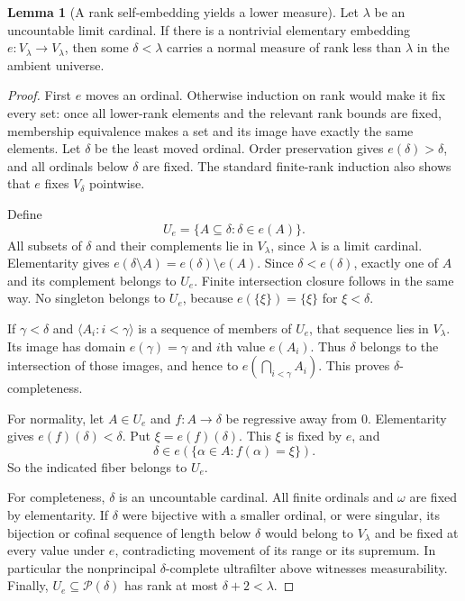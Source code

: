 \documentclass[11pt,letterpaper]{article}
\theoremstyle{definition}
\newtheorem{lemma}[definition]{Lemma}
\numberwithin{equation}{section}
\begin{document}
\begin{lemma}[A rank self-embedding yields a lower measure]\label{lem:I3measure}
Let $\lambda$ be an uncountable limit cardinal. If there is a nontrivial elementary embedding $e:V_\lambda\to V_\lambda$, then some $\delta<\lambda$ carries a normal measure of rank less than $\lambda$ in the ambient universe.
\end{lemma}
\begin{proof}
First $e$ moves an ordinal. Otherwise induction on rank would make it fix every set: once all lower-rank elements and the relevant rank bounds are fixed, membership equivalence makes a set and its image have exactly the same elements. Let $\delta$ be the least moved ordinal. Order preservation gives $e(\delta)>\delta$, and all ordinals below $\delta$ are fixed. The standard finite-rank induction also shows that $e$ fixes $V_\delta$ pointwise.

Define
\[
 U_e=\{A\subseteq\delta:\delta\in e(A)\}.
\]
All subsets of $\delta$ and their complements lie in $V_\lambda$, since $\lambda$ is a limit cardinal. Elementarity gives $e(\delta\setminus A)=e(\delta)\setminus e(A)$. Since $\delta<e(\delta)$, exactly one of $A$ and its complement belongs to $U_e$. Finite intersection closure follows in the same way. No singleton belongs to $U_e$, because $e(\{\xi\})=\{\xi\}$ for $\xi<\delta$.

If $\gamma<\delta$ and $\langle A_i:i<\gamma\rangle$ is a sequence of members of $U_e$, that sequence lies in $V_\lambda$. Its image has domain $e(\gamma)=\gamma$ and $i$th value $e(A_i)$. Thus $\delta$ belongs to the intersection of those images, and hence to $e(\bigcap_{i<\gamma}A_i)$. This proves $\delta$-completeness.

For normality, let $A\in U_e$ and $f:A\to\delta$ be regressive away from $0$. Elementarity gives $e(f)(\delta)<\delta$. Put $\xi=e(f)(\delta)$. This $\xi$ is fixed by $e$, and
\[
 \delta\in e(\{\alpha\in A:f(\alpha)=\xi\}).
\]
So the indicated fiber belongs to $U_e$.

For completeness, $\delta$ is an uncountable cardinal. All finite ordinals and $\omega$ are fixed by elementarity. If $\delta$ were bijective with a smaller ordinal, or were singular, its bijection or cofinal sequence of length below $\delta$ would belong to $V_\lambda$ and be fixed at every value under $e$, contradicting movement of its range or its supremum. In particular the nonprincipal $\delta$-complete ultrafilter above witnesses measurability. Finally, $U_e\subseteq\mathcal P(\delta)$ has rank at most $\delta+2<\lambda$.
\end{proof}
\end{document}
